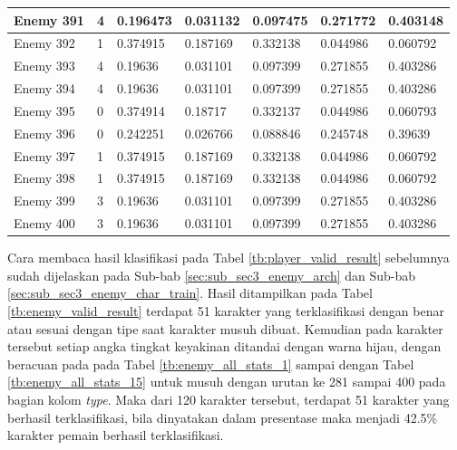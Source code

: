 \begin{longtable}{|l|l|l|l|l|l|l|}
	Enemy 391 & 4 & 0.196473 & 0.031132 & 0.097475 & 0.271772 & {\color[HTML]{009901} 0.403148} \\ \hline
	Enemy 392 & 1 & 0.374915 & {\color[HTML]{FE0000} 0.187169} & 0.332138 & 0.044986 & 0.060792 \\ \hline
	Enemy 393 & 4 & 0.19636 & 0.031101 & 0.097399 & 0.271855 & {\color[HTML]{009901} 0.403286} \\ \hline
	Enemy 394 & 4 & 0.19636 & 0.031101 & 0.097399 & 0.271855 & {\color[HTML]{009901} 0.403286} \\ \hline
	Enemy 395 & 0 & {\color[HTML]{009901} 0.374914} & 0.18717 & 0.332137 & 0.044986 & 0.060793 \\ \hline
	Enemy 396 & 0 & {\color[HTML]{FE0000} 0.242251} & 0.026766 & 0.088846 & 0.245748 & 0.39639 \\ \hline
	Enemy 397 & 1 & 0.374915 & {\color[HTML]{FE0000} 0.187169} & 0.332138 & 0.044986 & 0.060792 \\ \hline
	Enemy 398 & 1 & 0.374915 & {\color[HTML]{FE0000} 0.187169} & 0.332138 & 0.044986 & 0.060792 \\ \hline
	Enemy 399 & 3 & 0.19636 & 0.031101 & 0.097399 & {\color[HTML]{FE0000} 0.271855} & 0.403286 \\ \hline
	Enemy 400 & 3 & 0.19636 & 0.031101 & 0.097399 & {\color[HTML]{FE0000} 0.271855} & 0.403286 \\ \hline
\end{longtable}
\vspace{1ex}

Cara membaca hasil klasifikasi pada Tabel \ref{tb:player_valid_result} sebelumnya sudah dijelaskan pada Sub-bab \ref{sec:sub_sec3_enemy_arch} dan Sub-bab \ref{sec:sub_sec3_enemy_char_train}. Hasil ditampilkan pada Tabel \ref{tb:enemy_valid_result} terdapat 51 karakter yang terklasifikasi dengan benar atau sesuai dengan tipe saat karakter musuh dibuat. Kemudian pada karakter tersebut setiap angka tingkat keyakinan ditandai dengan warna hijau, dengan beracuan pada pada Tabel \ref{tb:enemy_all_stats_1} sampai dengan Tabel \ref{tb:enemy_all_stats_15} untuk musuh dengan urutan ke 281 sampai 400 pada bagian kolom \textit{type}. Maka dari 120 karakter tersebut, terdapat 51 karakter yang berhasil terklasifikasi, bila dinyatakan dalam presentase maka menjadi 42.5\% karakter pemain berhasil terklasifikasi.
